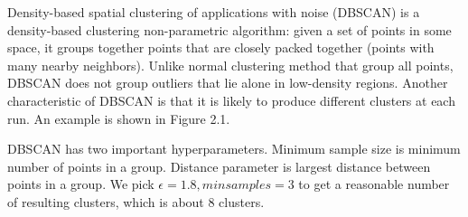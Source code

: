 Density-based spatial clustering of applications with noise (DBSCAN) is a density-based clustering non-parametric algorithm: given a set of points in some space, it groups together points that are closely packed together (points with many nearby neighbors).\cite{wiki:dbscan} Unlike normal clustering method that group all points, DBSCAN does not group outliers that lie alone in low-density regions. Another characteristic of DBSCAN is that it is likely to produce different clusters at each run. An example is shown in Figure 2.1.

DBSCAN has two important hyperparameters. Minimum sample size is minimum number of points in a group. Distance parameter is largest distance between points in a group. We pick \( \epsilon = 1.8, min samples = 3\) to get a reasonable number of resulting clusters, which is about 8 clusters.
